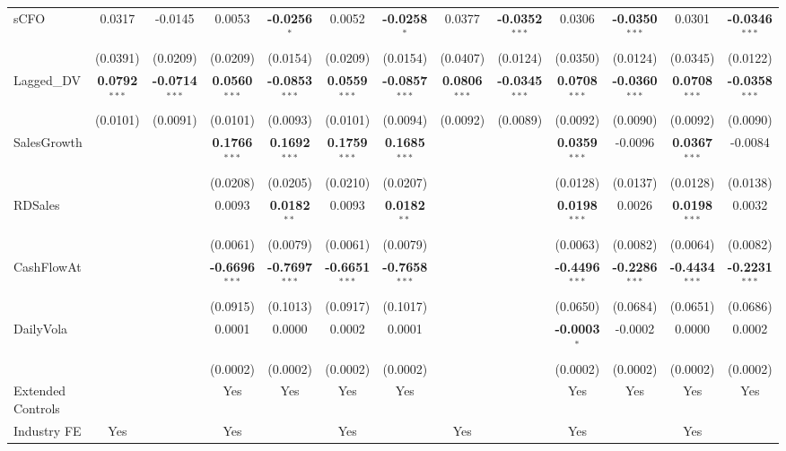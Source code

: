 \documentclass[11pt,a4paper]{article}
\begin{document}
\begin{table}[htbp]
\begin{tabular}{lcccccccccccc}
sCFO & 0.0317 & -0.0145 & 0.0053 & \textbf{-0.0256}$^{*}$ & 0.0052 & \textbf{-0.0258}$^{*}$ & 0.0377 & \textbf{-0.0352}$^{***}$ & 0.0306 & \textbf{-0.0350}$^{***}$ & 0.0301 & \textbf{-0.0346}$^{***}$ \\
 & (0.0391) & (0.0209) & (0.0209) & (0.0154) & (0.0209) & (0.0154) & (0.0407) & (0.0124) & (0.0350) & (0.0124) & (0.0345) & (0.0122) \\
Lagged\_DV & \textbf{0.0792}$^{***}$ & \textbf{-0.0714}$^{***}$ & \textbf{0.0560}$^{***}$ & \textbf{-0.0853}$^{***}$ & \textbf{0.0559}$^{***}$ & \textbf{-0.0857}$^{***}$ & \textbf{0.0806}$^{***}$ & \textbf{-0.0345}$^{***}$ & \textbf{0.0708}$^{***}$ & \textbf{-0.0360}$^{***}$ & \textbf{0.0708}$^{***}$ & \textbf{-0.0358}$^{***}$ \\
 & (0.0101) & (0.0091) & (0.0101) & (0.0093) & (0.0101) & (0.0094) & (0.0092) & (0.0089) & (0.0092) & (0.0090) & (0.0092) & (0.0090) \\
SalesGrowth &  &  & \textbf{0.1766}$^{***}$ & \textbf{0.1692}$^{***}$ & \textbf{0.1759}$^{***}$ & \textbf{0.1685}$^{***}$ &  &  & \textbf{0.0359}$^{***}$ & -0.0096 & \textbf{0.0367}$^{***}$ & -0.0084 \\
 &  &  & (0.0208) & (0.0205) & (0.0210) & (0.0207) &  &  & (0.0128) & (0.0137) & (0.0128) & (0.0138) \\
RDSales &  &  & 0.0093 & \textbf{0.0182}$^{**}$ & 0.0093 & \textbf{0.0182}$^{**}$ &  &  & \textbf{0.0198}$^{***}$ & 0.0026 & \textbf{0.0198}$^{***}$ & 0.0032 \\
 &  &  & (0.0061) & (0.0079) & (0.0061) & (0.0079) &  &  & (0.0063) & (0.0082) & (0.0064) & (0.0082) \\
CashFlowAt &  &  & \textbf{-0.6696}$^{***}$ & \textbf{-0.7697}$^{***}$ & \textbf{-0.6651}$^{***}$ & \textbf{-0.7658}$^{***}$ &  &  & \textbf{-0.4496}$^{***}$ & \textbf{-0.2286}$^{***}$ & \textbf{-0.4434}$^{***}$ & \textbf{-0.2231}$^{***}$ \\
 &  &  & (0.0915) & (0.1013) & (0.0917) & (0.1017) &  &  & (0.0650) & (0.0684) & (0.0651) & (0.0686) \\
DailyVola &  &  & 0.0001 & 0.0000 & 0.0002 & 0.0001 &  &  & \textbf{-0.0003}$^{*}$ & -0.0002 & 0.0000 & 0.0002 \\
 &  &  & (0.0002) & (0.0002) & (0.0002) & (0.0002) &  &  & (0.0002) & (0.0002) & (0.0002) & (0.0002) \\
\midrule
Extended Controls &  &  & Yes & Yes & Yes & Yes &  &  & Yes & Yes & Yes & Yes \\
Industry FE & Yes &  & Yes &  & Yes &  & Yes &  & Yes &  & Yes &  \\

\end{tabular}
\end{table}
\end{document}
